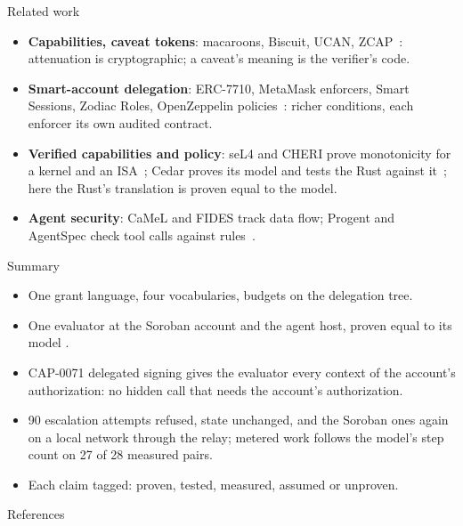 \documentclass[aspectratio=169,11pt]{beamer}
\begin{document}
\begin{frame}{Related work}
  \small
  \begin{itemize}
    \item \textbf{Capabilities, caveat tokens}: macaroons, Biscuit, UCAN,
      ZCAP~\cite{macaroons,biscuit,ucan,zcapld}: attenuation is
      cryptographic; a caveat's meaning is the verifier's code.
    \item \textbf{Smart-account delegation}: ERC-7710, MetaMask enforcers,
      Smart Sessions, Zodiac Roles, OpenZeppelin
      policies~\cite{erc7710,metamaskDelegation,smartSessions,zodiacRoles,ozStellarAccounts}:
      richer conditions, each enforcer its own audited contract.
    \item \textbf{Verified capabilities and policy}: seL4 and CHERI prove
      monotonicity for a kernel and an ISA~\cite{sel4Integrity,cheriProofs};
      Cedar proves its model and tests the Rust against it~\cite{cedar,cedarHow};
      here the Rust's translation is proven equal to the model.
    \item \textbf{Agent security}: CaMeL and FIDES track data flow; Progent
      and AgentSpec check tool calls against rules~\cite{camel,fides,progent,agentspec}.
  \end{itemize}
\end{frame}

\begin{frame}{Summary}
  \begin{itemize}
    \item One grant language, four vocabularies, budgets on the delegation
      tree.
    \item One evaluator at the Soroban account and the agent host, proven
      equal to its model \translationtrust.
    \item CAP-0071 delegated signing gives the evaluator every context of the
      account's authorization: no hidden call that needs the account's
      authorization.
    \item 90 escalation attempts refused, state unchanged, and the Soroban
      ones again on a local network through the relay; metered work follows
      the model's step count on 27 of 28 measured pairs.
    \item Each claim tagged: proven, tested, measured, assumed or unproven.
  \end{itemize}
\end{frame}

\begin{frame}[allowframebreaks]{References}
  \tiny
  
  
\end{frame}
\end{document}
